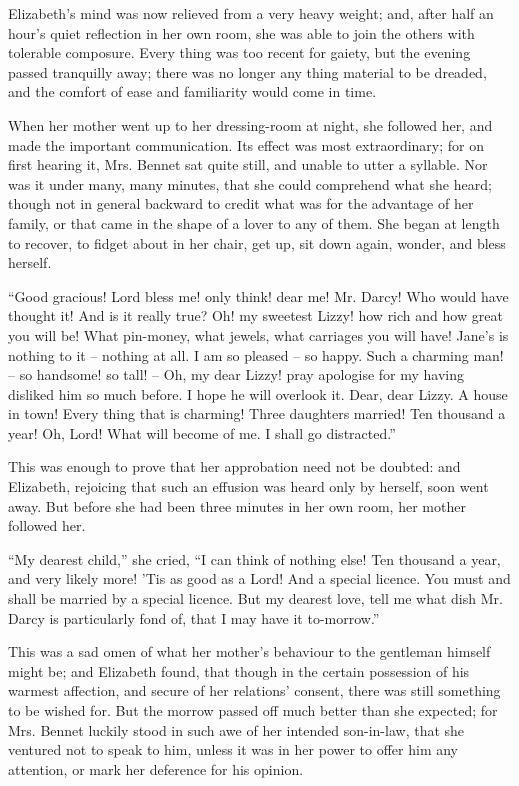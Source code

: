 Elizabeth’s mind was now relieved from a very heavy
weight; and, after half an hour’s quiet reflection in her
own room, she was able to join the others with tolerable
composure. Every thing was too recent for gaiety, but
the evening passed tranquilly away; there was no longer
any thing material to be dreaded, and the comfort of
ease and familiarity would come in time.

When her mother went up to her dressing-room at
night, she followed her, and made the important
communication. Its effect was most extraordinary; for on
first hearing it, Mrs. Bennet sat quite still, and unable to
utter a syllable. Nor was it under many, many minutes,
that she could comprehend what she heard; though not
in general backward to credit what was for the advantage
of her family, or that came in the shape of a lover to any
of them. She began at length to recover, to fidget about
in her chair, get up, sit down again, wonder, and bless
herself.

“Good gracious! Lord bless me! only think! dear
me! Mr. Darcy! Who would have thought it! And
is it really true? Oh! my sweetest Lizzy! how rich and
how great you will be! What pin-money, what jewels,
what carriages you will have! Jane’s is nothing to it -- nothing
at all. I am so pleased -- so happy. Such a charming
man! -- so handsome! so tall! -- Oh, my dear Lizzy!
pray apologise for my having disliked him so much before.
I hope he will overlook it. Dear, dear Lizzy. A house
in town! Every thing that is charming! Three daughters
married! Ten thousand a year! Oh, Lord! What will
become of me. I shall go distracted.”

This was enough to prove that her approbation need
not be doubted: and Elizabeth, rejoicing that such an
effusion was heard only by herself, soon went away. But
before she had been three minutes in her own room, her
mother followed her.

“My dearest child,” she cried, “I can think of nothing
else! Ten thousand a year, and very likely more! ’Tis
as good as a Lord! And a special licence. You must and
shall be married by a special licence. But my dearest
love, tell me what dish Mr. Darcy is particularly fond of,
that I may have it to-morrow.”

This was a sad omen of what her mother’s behaviour
to the gentleman himself might be; and Elizabeth found,
that though in the certain possession of his warmest
affection, and secure of her relations’ consent, there was
still something to be wished for. But the morrow passed
off much better than she expected; for Mrs. Bennet
luckily stood in such awe of her intended son-in-law, that
she ventured not to speak to him, unless it was in her
power to offer him any attention, or mark her deference
for his opinion.

